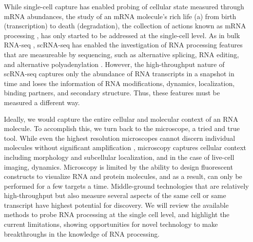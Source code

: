 While single-cell capture has enabled probing of cellular state measured through mRNA abundances, the study of an mRNA molecule's rich life (a) from birth (transcription) to death (degradation), the collection of actions known as mRNA processing  \cite{Blanc2003-wk,Gerstberger2014-hj,Yeo2016-do,Nussbacher2015-kr,Singh2015-gd}, has only started to be addressed at the single-cell level. As in bulk RNA-seq  \cite{Anders2012-fq,Kleinman2012-td,Lianoglou2013-pc,Nishikura2010-dk,Park2012-av,Peng2012-ru,Shen2014-zq,Wang2008-xh}, scRNA-seq has enabled the investigation of RNA processing features that are measureable by sequencing, such as alternative splicing, RNA editing, and alternative polyadenylation  \cite{Karlsson2017-wy,Marinov2014-iw,Picardi2017-bv,Shalek2013-ez,Velten2015-zd,Welch2016-it}. However, the high-throughput nature of scRNA-seq captures only the abundance of RNA transcripts in a snapshot in time and loses the information of RNA modifications, dynamics, localization, binding partners, and secondary structure. Thus, these features must be measured a different way.

Ideally, we would capture the entire cellular and molecular context of an RNA molecule. To accomplish this, we turn back to the microscope, a tried and true tool. While even the highest resolution microscopes cannot discern individual molecules without significant amplification  \cite{Femino1998-ws,Raj2009-ni}, microscopy captures cellular context including morphology and subcellular localization, and in the case of live-cell imaging, dynamics. Microscopy is limited by the ability to design fluorescent constructs to visualize RNA and protein molecules, and as a result, can only be performed for a few targets a time. Middle-ground technologies that are relatively high-throughput but also measure several aspects of the same cell or same transcript  \cite{Gierahn2017-ko,Macaulay2017-tb} have highest potential for discovery.
We will review the available methods to probe RNA processing at the single cell level, and highlight the current limitations, showing opportunities for novel technology to make breakthroughs in the knowledge of RNA processing.

